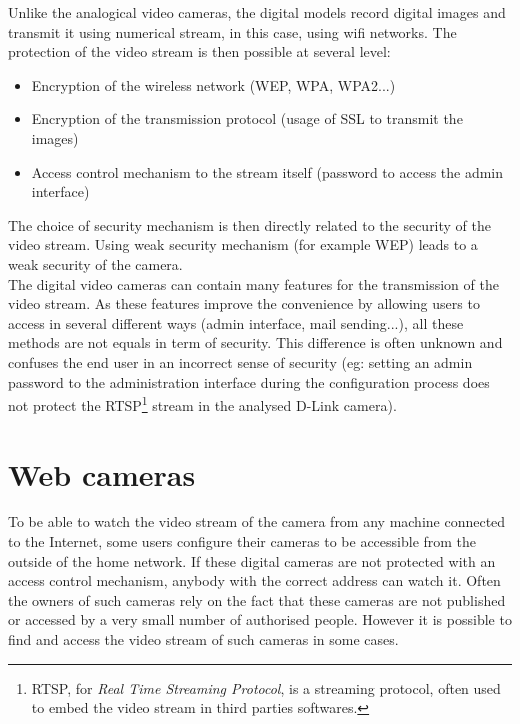 Unlike the analogical video cameras, the digital models record digital images and transmit it using numerical stream, in this case, using wifi networks.
The protection of the video stream is then possible at several level:\\

\begin{itemize}
\item Encryption of the wireless network (WEP, WPA, WPA2...)
\item Encryption of the transmission protocol (usage of SSL to transmit the images)
\item Access control mechanism to the stream itself (password to access the admin interface)
\end{itemize}

The choice of security mechanism is then directly related to the security of the video stream.
Using weak security mechanism (for example WEP) leads to a weak security of the camera.\\

The digital video cameras can contain many features for the transmission of the video stream.
As these features improve the convenience by allowing users to access in several different ways (admin interface, mail sending...), all these methods are not equals in term of security.
This difference is often unknown and confuses the end user in an incorrect sense of security (eg: setting an admin password to the administration interface during the configuration process does not protect the RTSP\footnote{RTSP, for \emph{Real Time Streaming Protocol}, is a streaming protocol, often used to embed the video stream in third parties softwares.} stream in the analysed D-Link camera).

\section{Web cameras}
\label{sec:cam-google}

To be able to watch the video stream of the camera from any machine connected to the Internet, some users configure their cameras to be accessible from the outside of the home network.
If these digital cameras are not protected with an access control mechanism, anybody with the correct address can watch it.
Often the owners of such cameras rely on the fact that these cameras are not published or accessed by a very small number of authorised people.
However it is possible to find and access the video stream of such cameras in some cases.

